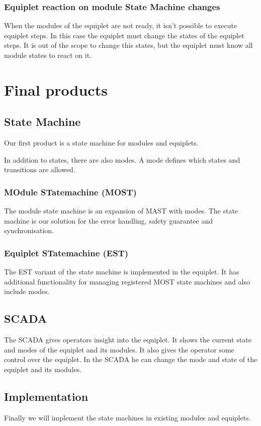 \documentclass[12pt,a4paper]{report}
\begin{document}
\subsubsection{Equiplet reaction on module State Machine changes}
When the modules of the equiplet are not ready, it isn't possible to execute equiplet steps. In this case the equiplet must change the states of the equiplet steps. It is out of the scope to change this states, but the equiplet must know all module states to react on it.

\newpage
\section{Final products}
\subsection{State Machine}
Our first product is a state machine for modules and equiplets. 

In addition to states, there are also modes.
A mode defines which states and transitions are allowed.

\subsubsection{MOdule STatemachine (MOST)}
The module state machine is an expansion of MAST with modes.
The state machine is our solution for the error handling, safety guarantee and synchronisation.

\subsubsection{Equiplet STatemachine (EST)}
The EST variant of the state machine is implemented in the equiplet.
It has additional functionality for managing registered MOST state machines and also include modes.

\subsection{SCADA}
The SCADA gives operators insight into the equiplet.
It shows the current state and modes of the equiplet and its modules.
It also gives the operator some control over the equiplet.
In the SCADA he can change the mode and state of the equiplet and its modules.

\subsection{Implementation}
Finally we will implement the state machines in existing modules and equiplets.
\end{document}
